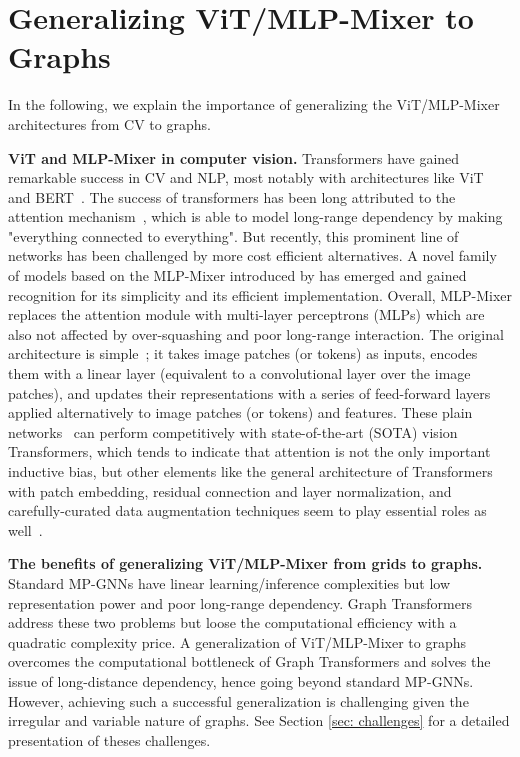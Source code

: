 \documentclass{article}
\begin{document}
\section{Generalizing ViT/MLP-Mixer to Graphs}\label{sec:contribution}
In the following, we explain the importance of generalizing the ViT/MLP-Mixer architectures from CV to graphs. 

\textbf{ViT and MLP-Mixer in computer vision.} Transformers have gained remarkable success in CV and NLP, most notably with architectures like ViT~\citep{dosovitskiy2020ViT} and BERT~\citep{devlin2018bert}. The success of transformers has been long attributed to the attention mechanism~\citep{vaswani2017attention}, which is able to model long-range dependency by making "everything connected to everything".
But recently, this prominent line of networks has been challenged by more cost efficient alternatives. A novel family of models based on the MLP-Mixer introduced by \citet{tolstikhin2021mlp} has emerged and gained recognition for its simplicity and its efficient implementation. Overall, MLP-Mixer replaces the attention module with multi-layer perceptrons (MLPs) which are also not affected by over-squashing and poor long-range interaction. The original architecture is simple~\citep{tolstikhin2021mlp}; it takes image patches (or tokens) as inputs, encodes them with a linear layer (equivalent to a convolutional layer over the image patches), and updates their representations with a series of feed-forward layers applied alternatively to image patches (or tokens) and features. 
These plain networks~\citep{tolstikhin2021mlp, touvron2021resmlp, liu2021gmlp, wang2022dynamixer} can perform competitively with state-of-the-art (SOTA) vision Transformers, which tends to indicate that attention is not the only important inductive bias, but other elements like the general architecture of Transformers with patch embedding, residual connection and layer normalization, and carefully-curated data augmentation techniques seem to play essential roles as well~\citep{yu2022metaformer}.


\textbf{The benefits of generalizing ViT/MLP-Mixer from grids to graphs.} 
Standard MP-GNNs have linear learning/inference complexities but low representation power and poor long-range dependency. Graph Transformers address these two problems but loose the computational efficiency with a quadratic complexity price. A generalization of ViT/MLP-Mixer to graphs overcomes the computational bottleneck of Graph Transformers and solves the issue of long-distance dependency, hence going beyond standard MP-GNNs.  However, achieving such a successful generalization is challenging given the irregular and variable nature of graphs. See Section \ref{sec: challenges} for a detailed presentation of theses challenges.
\end{document}
